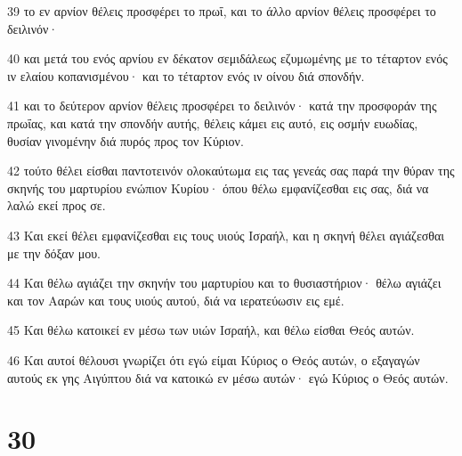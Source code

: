 \par 39 το εν αρνίον θέλεις προσφέρει το πρωΐ, και το άλλο αρνίον θέλεις προσφέρει το δειλινόν·
\par 40 και μετά του ενός αρνίου εν δέκατον σεμιδάλεως εζυμωμένης με το τέταρτον ενός ιν ελαίου κοπανισμένου· και το τέταρτον ενός ιν οίνου διά σπονδήν.
\par 41 και το δεύτερον αρνίον θέλεις προσφέρει το δειλινόν· κατά την προσφοράν της πρωΐας, και κατά την σπονδήν αυτής, θέλεις κάμει εις αυτό, εις οσμήν ευωδίας, θυσίαν γινομένην διά πυρός προς τον Κύριον.
\par 42 τούτο θέλει είσθαι παντοτεινόν ολοκαύτωμα εις τας γενεάς σας παρά την θύραν της σκηνής του μαρτυρίου ενώπιον Κυρίου· όπου θέλω εμφανίζεσθαι εις σας, διά να λαλώ εκεί προς σε.
\par 43 Και εκεί θέλει εμφανίζεσθαι εις τους υιούς Ισραήλ, και η σκηνή θέλει αγιάζεσθαι με την δόξαν μου.
\par 44 Και θέλω αγιάζει την σκηνήν του μαρτυρίου και το θυσιαστήριον· θέλω αγιάζει και τον Ααρών και τους υιούς αυτού, διά να ιερατεύωσιν εις εμέ.
\par 45 Και θέλω κατοικεί εν μέσω των υιών Ισραήλ, και θέλω είσθαι Θεός αυτών.
\par 46 Και αυτοί θέλουσι γνωρίζει ότι εγώ είμαι Κύριος ο Θεός αυτών, ο εξαγαγών αυτούς εκ γης Αιγύπτου διά να κατοικώ εν μέσω αυτών· εγώ Κύριος ο Θεός αυτών.

\chapter{30}

